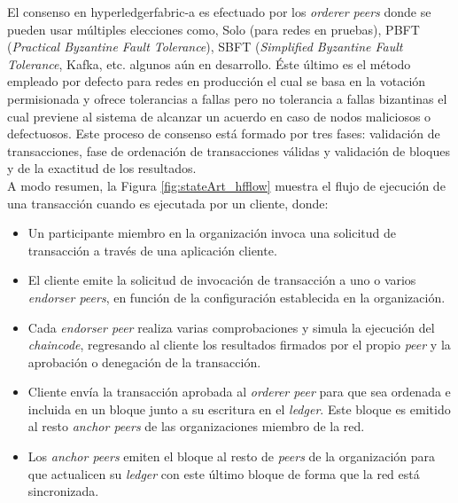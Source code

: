 \documentclass[12pt,a4paper, twoside]{report}
\begin{document}
	El consenso en \gls{hyperledgerfabric-a} es efectuado por los \textit{orderer peers} donde se pueden usar múltiples elecciones como, Solo (para redes en pruebas), PBFT (\textit{Practical Byzantine Fault Tolerance}), SBFT (\textit{Simplified Byzantine Fault Tolerance}, Kafka, etc. algunos aún en desarrollo. Éste último es el método empleado por defecto para redes en producción el cual se basa en la votación permisionada y ofrece tolerancias a fallas pero no tolerancia a fallas bizantinas el cual previene al sistema de alcanzar un acuerdo en caso de nodos maliciosos o defectuosos. Este proceso de consenso está formado por tres fases: validación de transacciones, fase de ordenación de transacciones válidas y validación de bloques y de la exactitud de los resultados. \\

	A modo resumen, la Figura \ref{fig:stateArt_hfflow} muestra el flujo de ejecución de una transacción cuando es ejecutada por un cliente, donde:

	\begin{itemize}
		\item Un participante miembro en la organización invoca una solicitud de transacción a través de una aplicación cliente.
		\item El cliente emite la solicitud de invocación de transacción a uno o varios \textit{endorser peers}, en función de la configuración establecida en la organización.
		\item Cada \textit{endorser peer} realiza varias comprobaciones y simula la ejecución del \textit{\gls{chaincode}}, regresando al cliente los resultados firmados por el propio \textit{peer} y la aprobación o denegación de la transacción.
		\item Cliente envía la transacción aprobada al \textit{orderer peer} para que sea ordenada e incluida en un bloque junto a su escritura en el \textit{ledger}. Este bloque es emitido al resto \textit{anchor peers} de las organizaciones miembro de la red.
		\item Los \textit{anchor peers} emiten el bloque al resto de \textit{peers} de la organización para que actualicen su \textit{ledger} con este último bloque de forma que la red está sincronizada.
	\end{itemize}
	
\end{document}
